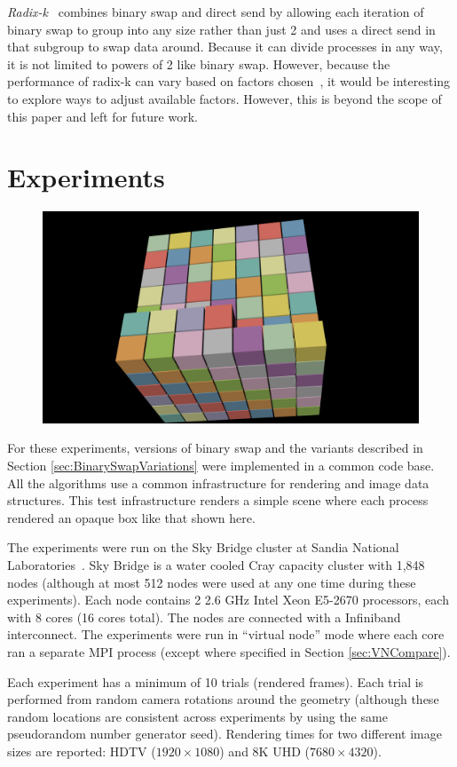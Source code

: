 \documentclass{vgtc}                          %
\newcommand*{\lcite}[1]{~\cite{#1}}
\newcommand*{\keyterm}[1]{\emph{#1}}
\begin{document}
\keyterm{Radix-k}\lcite{RadixK} combines binary swap and direct send by allowing each iteration of binary swap to group into any size rather than just 2 and uses a direct send in that subgroup to swap data around.
Because it can divide processes in any way, it is not limited to powers of 2 like binary swap.
However, because the performance of radix-k can vary based on factors chosen\lcite{Kendall2010,Moreland2011:SC}, it would be interesting to explore ways to adjust available factors.
However, this is beyond the scope of this paper and left for future work.

\section{Experiments}
\label{sec:Results}

\begin{figure}
  \includegraphics[width=.5\linewidth]{render-example-hdtv}
\end{figure}
For these experiments, versions of binary swap and the variants described in Section \ref{sec:BinarySwapVariations} were implemented in a common code base.
All the algorithms use a common infrastructure for rendering and image data structures.
This test infrastructure renders a simple scene where each process rendered an opaque box like that shown here.

The experiments were run on the Sky Bridge cluster at Sandia National Laboratories\lcite{SkyBridge}.
Sky Bridge is a water cooled Cray capacity cluster with 1,848 nodes (although at most 512 nodes were used at any one time during these experiments).
Each node contains 2 2.6 GHz Intel Xeon E5-2670 processors, each with 8 cores (16 cores total).
The nodes are connected with a Infiniband interconnect.
The experiments were run in ``virtual node'' mode where each core ran a separate MPI process (except where specified in Section \ref{sec:VNCompare}).

Each experiment has a minimum of 10 trials (rendered frames).
Each trial is performed from random camera rotations around the geometry (although these random locations are consistent across experiments by using the same pseudorandom number generator seed).
Rendering times for two different image sizes are reported: HDTV ($1920 \times 1080$) and 8K UHD ($7680 \times 4320$).
\end{document}
